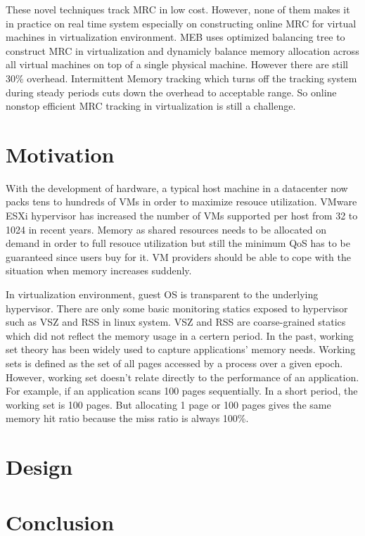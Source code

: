 \documentclass[10pt,twocolumn]{article}
\begin{document}
These novel techniques track MRC in low cost. However, none of them makes it in practice on real time system especially on constructing online MRC for virtual machines in virtualization environment. MEB\cite{Wang2016Dynamic} uses optimized balancing tree to construct MRC in virtualization and dynamicly balance memory allocation across all virtual machines on top of a single physical machine. However there are still 30\% overhead. Intermittent Memory tracking which turns off the tracking system during steady periods cuts down the overhead to acceptable range. So online nonstop efficient MRC tracking in virtualization is still a challenge.

\section{Motivation}
With the development of hardware, a typical host machine in a datacenter now packs tens to hundreds of VMs in order to maximize resouce utilization. VMware ESXi hypervisor has increased the number of VMs supported per host from 32 to 1024 in recent years\cite{vmware}. Memory as shared resources needs to be allocated on demand in order to full resouce utilization but still the minimum QoS has to be guaranteed since users buy for it. VM providers should be able to cope with the situation when memory increases suddenly.

In virtualization environment, guest OS is transparent to the underlying hypervisor. There are only some basic monitoring statics exposed to hypervisor such as VSZ and RSS in linux system. VSZ and RSS are coarse-grained statics which did not reflect the memory usage in a certern period. In the past, working set theory\cite{wss} has been widely used to capture applications' memory needs. Working sets is defined as the set of all pages accessed by a process over a given epoch. However, working set doesn't relate directly to the performance of an application. For example, if an application scans 100 pages sequentially. In a short period, the working set is 100 pages. But allocating 1 page or 100 pages gives the same memory hit ratio because the miss ratio is always 100\%.


\section{Design}


\section{Conclusion}





\end{document}
